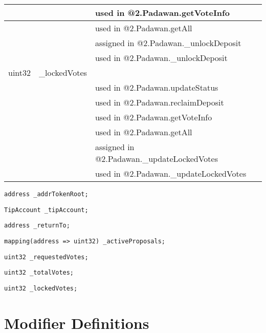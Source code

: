 \begin{tabular}{|l|l|p{5cm}|}
 & & used in @2.Padawan.getVoteInfo\\\hline
 & & used in @2.Padawan.getAll\\\hline
 & & assigned in @2.Padawan.\_{}unlockDeposit\\\hline
 & & used in @2.Padawan.\_{}unlockDeposit\\\hline
uint32 & \_{}lockedVotes &  \\\hline
 & & used in @2.Padawan.updateStatus\\\hline
 & & used in @2.Padawan.reclaimDeposit\\\hline
 & & used in @2.Padawan.getVoteInfo\\\hline
 & & used in @2.Padawan.getAll\\\hline
 & & assigned in @2.Padawan.\_{}updateLockedVotes\\\hline
 & & used in @2.Padawan.\_{}updateLockedVotes\\\hline
\end{tabular}
\fi


\begin{lstlisting}[firstnumber=21]
    address _addrTokenRoot;
\end{lstlisting}

\begin{lstlisting}[firstnumber=23]
    TipAccount _tipAccount;
\end{lstlisting}

\begin{lstlisting}[firstnumber=24]
    address _returnTo;
\end{lstlisting}

\begin{lstlisting}[firstnumber=26]
    mapping(address => uint32) _activeProposals;
\end{lstlisting}

\begin{lstlisting}[firstnumber=28]
    uint32 _requestedVotes;
\end{lstlisting}

\begin{lstlisting}[firstnumber=29]
    uint32 _totalVotes;
\end{lstlisting}

\begin{lstlisting}[firstnumber=30]
    uint32 _lockedVotes;
\end{lstlisting}

\section{Modifier Definitions}


